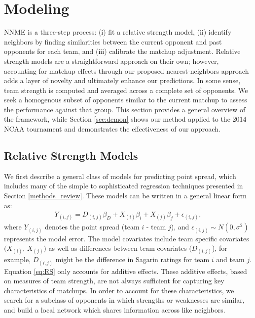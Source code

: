 \documentclass[letterpaper,12pt]{article}
\begin{document}
\section{Modeling\label{sec:NNME}}
NNME is a three-step process: (i) fit a relative strength model, (ii) identify neighbors by finding similarities between the current opponent and past opponents for each team, and (iii) calibrate the matchup adjustment. Relative strength models are a straightforward approach on their own; however, accounting for matchup effects through our proposed nearest-neighbors approach adds a layer of novelty and ultimately enhance our predictions. In some sense, team strength is computed and averaged across a complete set of opponents. We seek a homogenous subset of opponents similar to the current matchup to assess the performance against that group. This section provides a general overview of the framework, while Section \ref{sec:demon} shows our method applied to the 2014 NCAA tournament and demonstrates the effectiveness of our approach.

\subsection{Relative Strength Models \label{sec:AS}}
We first describe a general class of models for predicting point spread, which includes many of the simple to sophisticated regression techniques presented in Section \ref{methods_review}. These models can be written in a general linear form as:
\begin{eqnarray}
Y_{(i,j)} = D_{(i,j)} \beta_D + X_{(i)} \beta_i + X_{(j)} \beta_j +  \epsilon_{(i,j)},
\label{eq:RS}
\end{eqnarray}
where $Y_{(i,j)}$ denotes the point spread (team $i$ - team $j$), and $\epsilon_{(i,j)}\sim N(0,\sigma^2)$ represents the model error. The model covariates include team specific covariates $(X_{(i)}$, $X_{(j)})$ as well as differences between team covariates ($D_{(i,j)}$), for example, $D_{(i,j)}$ might be the difference in Sagarin ratings for team $i$ and team $j$. Equation \ref{eq:RS} only accounts for additive effects. These additive effects, based on measures of team strength, are not always sufficient for capturing key characteristics of matchups. In order to account for these characteristics, we search for a subclass of opponents in which strengths or weaknesses are similar, and build a local network which shares information across like neighbors.  
\end{document}
